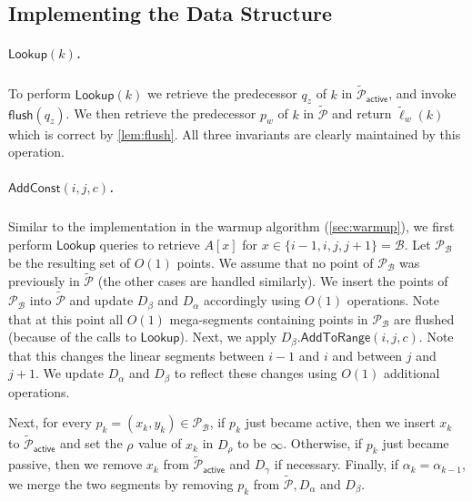 \documentclass[a4paper,UKenglish,cleveref, autoref, thm-restate]{lipics-v2021}
\newcommand{\AC}{\mathsf{AddConst}}
\newcommand{\AtR}{\mathsf{AddToRange}}
\newcommand{\Lookup}{\mathsf{Lookup}}
\renewcommand{\P}{\mathcal{P}}
\newcommand{\TAP}{\tilde{\P}_{\mathsf{active}}}
\newcommand{\DAL}{D_{\alpha}}
\newcommand{\Dbeta}{D_{\beta}}
\newcommand{\DGAM}{D_{\gamma}}
\newcommand{\tell}{\tilde{\ell}}
\newcommand{\TP}{\tilde{\P}}
\newcommand{\para}[1]{\vspace{-0.1in} \subparagraph*{#1}}
\newcommand{\B}{\mathcal{B}}
\newcommand{\rl}[1]{\rho_{#1}}
\newcommand{\flush}{\mathsf{flush}}
\begin{document}
\subsection{Implementing the Data Structure}

\subparagraph*{$\Lookup(k)$.} To perform $\Lookup(k)$ we retrieve the predecessor $q_z$ of $k$ in $\TAP$, and invoke $\flush(q_z)$. We then retrieve the predecessor $p_w$ of $k$ in $\TP$ and return $\tell_w(k)$ which is correct by \cref{lem:flush}. All three invariants are clearly maintained by this operation. 

\para{$\AC(i,j,c)$.}
Similar to the implementation in the warmup algorithm (\cref{sec:warmup}), we first perform $\Lookup$ queries to retrieve $A[x]$ for $x\in\{i-1,i,j,j+1\}=\B$. Let $\P_\B$ be the resulting set of $O(1)$ points. We assume that no point of $\P_\B$ was previously in $\TP$ (the other cases are handled similarly). 
We insert the points of $\P_\B$ into $\TP$ and update $\Dbeta$ and $\DAL$ accordingly using $O(1)$ operations. Note that at this point all $O(1)$ mega-segments containing points in $\P_\B$ are flushed (because of the calls to $\Lookup$). 
Next, we apply $\Dbeta.\AtR(i,j,c)$. 
Note that this changes the linear segments between $i-1$ and $i$ and between $j$ and $j+1$.
We update $\DAL$ and $\Dbeta$ to reflect these changes using $O(1)$ additional operations.

Next, 
for every $p_k = (x_k,y_k) \in \P_{\B}$, 
 if $p_k$ just became active, then we insert $x_k$ to $\TAP$  and set the $\rl{}$ value of $x_k$ in $D_\rho$ to be $\infty$. 
Otherwise, if $p_k$ just became passive, then we remove $x_k$ from $\TAP$ and $\DGAM$ if necessary.
Finally, if $\alpha_k=\alpha_{k-1}$, we merge the two segments by removing $p_k$ from $\TP, D_\alpha$ and $D_\beta$.
\end{document}
